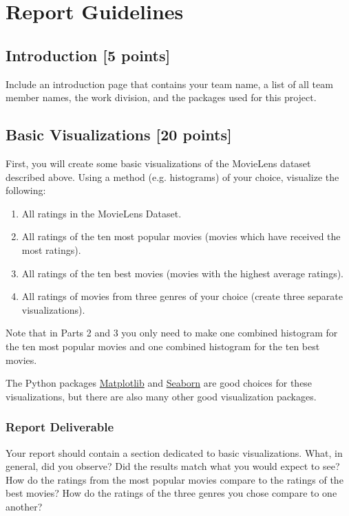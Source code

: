 \section{Report Guidelines}

\subsection{Introduction [5 points]}
Include an introduction page that contains your team name, a list of all team member names, the work division, and the packages used for this project.

\subsection{Basic Visualizations [20 points]}
First, you will create some basic visualizations of the MovieLens dataset described above. Using a method (e.g. histograms) of your choice, visualize the following:

\begin{enumerate}
	\item All ratings in the MovieLens Dataset.
	\item All ratings of the ten most popular movies (movies which have received the most ratings).
	\item All ratings of the ten best movies (movies with the highest average ratings).
	\item All ratings of movies from three genres of your choice (create three separate visualizations).
\end{enumerate}

Note that in Parts 2 and 3 you only need to make one combined histogram for the ten most popular movies and one combined histogram for the ten best movies.


The Python packages \href{http://matplotlib.org/} {Matplotlib} and \href{http://seaborn.pydata.org/} {Seaborn} are good choices for these visualizations, but there are also many other good visualization packages.

\subsubsection{Report Deliverable}
Your report should contain a section dedicated to basic visualizations. What, in general, did you observe? Did the results match what you would expect to see? How do the ratings from the most popular movies compare to the ratings of the best movies? How do the ratings of the three genres you chose compare to one another?


